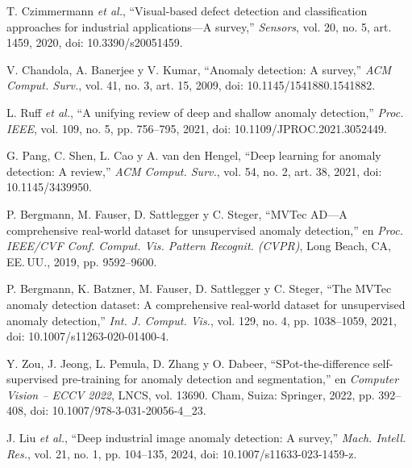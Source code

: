 \documentclass[12pt,oneside]{report}
\begin{document}
\begingroup
\makeatletter
\renewenvironment{thebibliography}[1]{%
  \list{\@biblabel{\@arabic\c@enumiv}}{%
    \settowidth\labelwidth{\@biblabel{#1}}%
    \leftmargin\labelwidth\advance\leftmargin\labelsep
    \itemsep=0.5\baselineskip\parsep=0pt
    \usecounter{enumiv}\let\p@enumiv\@empty
    \renewcommand\theenumiv{\@arabic\c@enumiv}}%
  \singlespacing\RaggedRight}{\endlist}
\makeatother
\begin{thebibliography}{99}
 T. Czimmermann \textit{et al.}, ``Visual-based defect detection and classification approaches for industrial applications---A survey,'' \textit{Sensors}, vol. 20, no. 5, art. 1459, 2020, doi: 10.3390/s20051459.

 V. Chandola, A. Banerjee y V. Kumar, ``Anomaly detection: A survey,'' \textit{ACM Comput. Surv.}, vol. 41, no. 3, art. 15, 2009, doi: 10.1145/1541880.1541882.

 L. Ruff \textit{et al.}, ``A unifying review of deep and shallow anomaly detection,'' \textit{Proc. IEEE}, vol. 109, no. 5, pp. 756--795, 2021, doi: 10.1109/JPROC.2021.3052449.

 G. Pang, C. Shen, L. Cao y A. van den Hengel, ``Deep learning for anomaly detection: A review,'' \textit{ACM Comput. Surv.}, vol. 54, no. 2, art. 38, 2021, doi: 10.1145/3439950.

 P. Bergmann, M. Fauser, D. Sattlegger y C. Steger, ``MVTec AD---A comprehensive real-world dataset for unsupervised anomaly detection,'' en \textit{Proc. IEEE/CVF Conf. Comput. Vis. Pattern Recognit. (CVPR)}, Long Beach, CA, EE.\,UU., 2019, pp. 9592--9600.

 P. Bergmann, K. Batzner, M. Fauser, D. Sattlegger y C. Steger, ``The MVTec anomaly detection dataset: A comprehensive real-world dataset for unsupervised anomaly detection,'' \textit{Int. J. Comput. Vis.}, vol. 129, no. 4, pp. 1038--1059, 2021, doi: 10.1007/s11263-020-01400-4.

 Y. Zou, J. Jeong, L. Pemula, D. Zhang y O. Dabeer, ``SPot-the-difference self-supervised pre-training for anomaly detection and segmentation,'' en \textit{Computer Vision -- ECCV 2022}, LNCS, vol. 13690. Cham, Suiza: Springer, 2022, pp. 392--408, doi: 10.1007/978-3-031-20056-4\_23.

 J. Liu \textit{et al.}, ``Deep industrial image anomaly detection: A survey,'' \textit{Mach. Intell. Res.}, vol. 21, no. 1, pp. 104--135, 2024, doi: 10.1007/s11633-023-1459-z.


\end{thebibliography}
\end{document}
